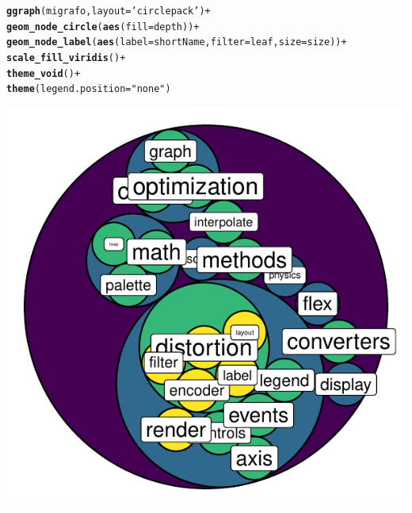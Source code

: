 \documentclass{article}\usepackage[]{graphicx}\usepackage[]{color}
\makeatletter
\def\maxwidth{ %
  \ifdim\Gin@nat@width>\linewidth
    \linewidth
  \else
    \Gin@nat@width
  \fi
}
\newcommand{\hlstr}[1]{\textcolor[rgb]{0.192,0.494,0.8}{#1}}%
\newcommand{\hlopt}[1]{\textcolor[rgb]{0,0,0}{#1}}%
\newcommand{\hlstd}[1]{\textcolor[rgb]{0.345,0.345,0.345}{#1}}%
\newcommand{\hlkwc}[1]{\textcolor[rgb]{0.333,0.667,0.333}{#1}}%
\newcommand{\hlkwd}[1]{\textcolor[rgb]{0.737,0.353,0.396}{\textbf{#1}}}%
\newenvironment{kframe}{%
 \def\at@end@of@kframe{}%
 \ifinner\ifhmode%
  \def\at@end@of@kframe{\end{minipage}}%
  \begin{minipage}{\columnwidth}%
 \fi\fi%
 \def\FrameCommand##1{\hskip\@totalleftmargin \hskip-\fboxsep
 \colorbox{shadecolor}{##1}\hskip-\fboxsep
     \hskip-\linewidth \hskip-\@totalleftmargin \hskip\columnwidth}%
 \MakeFramed {\advance\hsize-\width
   \@totalleftmargin\z@ \linewidth\hsize
   \@setminipage}}%
 {\par\unskip\endMakeFramed%
 \at@end@of@kframe}
\newenvironment{knitrout}{}{} %
\makeatother
\begin{document}
\begin{knitrout}
\color{fgcolor}\begin{kframe}
\begin{alltt}
\hlkwd{ggraph}\hlstd{(migrafo,} \hlkwc{layout} \hlstd{=} \hlstr{'circlepack'}\hlstd{)} \hlopt{+}
  \hlkwd{geom_node_circle}\hlstd{(}\hlkwd{aes}\hlstd{(}\hlkwc{fill} \hlstd{= depth))} \hlopt{+}
  \hlkwd{geom_node_label}\hlstd{(}\hlkwd{aes}\hlstd{(}\hlkwc{label} \hlstd{= shortName,} \hlkwc{filter} \hlstd{= leaf,} \hlkwc{size} \hlstd{= size))} \hlopt{+}
  \hlkwd{scale_fill_viridis}\hlstd{()} \hlopt{+}
  \hlkwd{theme_void}\hlstd{()} \hlopt{+}
  \hlkwd{theme}\hlstd{(}\hlkwc{legend.position} \hlstd{=} \hlstr{"none"}\hlstd{)}
\end{alltt}
\end{kframe}

{\centering \includegraphics[width=\maxwidth]{figure/plot_ggraph-1-1} 

}



\end{knitrout}
\clearpage
\end{document}
